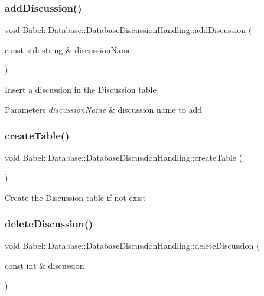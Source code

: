 \subsubsection{\texorpdfstring{add\+Discussion()}{addDiscussion()}}
{\footnotesize\ttfamily void Babel\+::\+Database\+::\+Database\+Discussion\+Handling\+::add\+Discussion (\begin{DoxyParamCaption}\item[{const std\+::string \&}]{discussion\+Name }\end{DoxyParamCaption})}

Insert a discussion in the Discussion table 
\begin{DoxyParams}{Parameters}
{\em discussion\+Name} & discussion name to add \\
\hline
\end{DoxyParams}
\mbox{\label{classBabel_1_1Database_1_1DatabaseDiscussionHandling_a6c7bbeaff0af08cdd8b6703731c008c6}} 
\subsubsection{\texorpdfstring{create\+Table()}{createTable()}}
{\footnotesize\ttfamily void Babel\+::\+Database\+::\+Database\+Discussion\+Handling\+::create\+Table (\begin{DoxyParamCaption}{ }\end{DoxyParamCaption})}

Create the Discussion table if not exist \mbox{\label{classBabel_1_1Database_1_1DatabaseDiscussionHandling_a2f07cfa4efafa1db0c6014eba5380088}} 
\subsubsection{\texorpdfstring{delete\+Discussion()}{deleteDiscussion()}}
{\footnotesize\ttfamily void Babel\+::\+Database\+::\+Database\+Discussion\+Handling\+::delete\+Discussion (\begin{DoxyParamCaption}\item[{const int \&}]{discussion }\end{DoxyParamCaption})}

